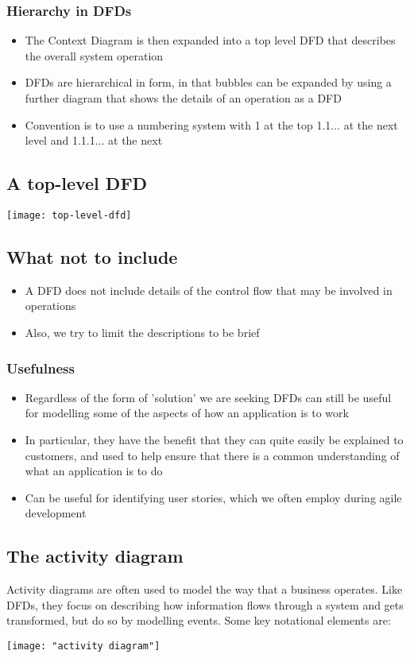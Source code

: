 \documentclass{article}[18pt]
\begin{document}
\subsubsection{Hierarchy in DFDs}
\begin{itemize}
	\item The Context Diagram is then expanded into a top level DFD that describes the overall system operation
	\item DFDs are hierarchical in form, in that bubbles can be expanded by using a further diagram that shows the details of an operation as a DFD
	\item Convention is to use a numbering system with 1 at the top 1.1... at the next level and 1.1.1... at the next
\end{itemize}
\subsection{A top-level DFD}
\begin{center}
	\texttt{[image: top-level-dfd]}
\end{center}
\subsection{What not to include}
\begin{itemize}
	\item A DFD does not include details of the control flow that may be involved in operations
	\item Also, we try to limit the descriptions to be brief
\end{itemize}
\subsubsection{Usefulness}
\begin{itemize}
	\item Regardless of the form of 'solution' we are seeking DFDs can still be useful for modelling some of the aspects of how an application is to work
	\item In particular, they have the benefit that they can quite easily be explained to customers, and used to help ensure that there is a common understanding of what an application is to do
	\item Can be useful for identifying user stories, which we often employ during agile development
\end{itemize}
\subsection{The activity diagram}
Activity diagrams are often used to model the way that a business operates. Like DFDs, they focus on describing how information flows through a system and gets transformed, but do so by modelling events. Some key notational elements are:
\begin{center}
	\texttt{[image: "activity diagram"]}
\end{center}
\end{document}

